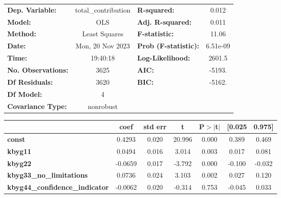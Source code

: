 \begin{center}
\begin{tabular}{lclc}
\toprule
\textbf{Dep. Variable:}                & total\_contribution & \textbf{  R-squared:         } &     0.012   \\
\textbf{Model:}                        &         OLS         & \textbf{  Adj. R-squared:    } &     0.011   \\
\textbf{Method:}                       &    Least Squares    & \textbf{  F-statistic:       } &     11.06   \\
\textbf{Date:}                         &   Mon, 20 Nov 2023  & \textbf{  Prob (F-statistic):} &  6.51e-09   \\
\textbf{Time:}                         &       19:40:18      & \textbf{  Log-Likelihood:    } &    2601.5   \\
\textbf{No. Observations:}             &          3625       & \textbf{  AIC:               } &    -5193.   \\
\textbf{Df Residuals:}                 &          3620       & \textbf{  BIC:               } &    -5162.   \\
\textbf{Df Model:}                     &             4       & \textbf{                     } &             \\
\textbf{Covariance Type:}              &      nonrobust      & \textbf{                     } &             \\
\bottomrule
\end{tabular}
\begin{tabular}{lcccccc}
                                       & \textbf{coef} & \textbf{std err} & \textbf{t} & \textbf{P$> |$t$|$} & \textbf{[0.025} & \textbf{0.975]}  \\
\midrule
\textbf{const}                         &       0.4293  &        0.020     &    20.996  &         0.000        &        0.389    &        0.469     \\
\textbf{kbyg11}                        &       0.0494  &        0.016     &     3.014  &         0.003        &        0.017    &        0.081     \\
\textbf{kbyg22}                        &      -0.0659  &        0.017     &    -3.792  &         0.000        &       -0.100    &       -0.032     \\
\textbf{kbyg33\_no\_limitations}       &       0.0736  &        0.024     &     3.103  &         0.002        &        0.027    &        0.120     \\
\textbf{kbyg44\_confidence\_indicator} &      -0.0062  &        0.020     &    -0.314  &         0.753        &       -0.045    &        0.033     \\

\end{tabular}
\end{center}
